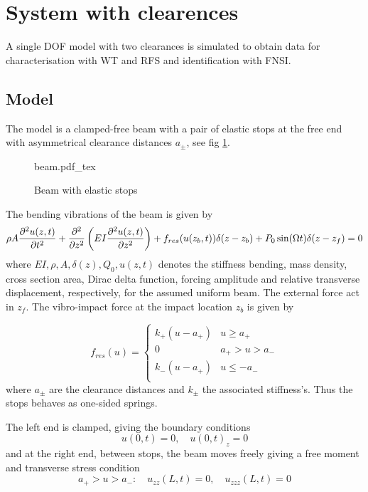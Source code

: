 \FloatBarrier
\section{System with clearences}
\label{sec:syst-with-clear}

A single DOF model with two clearances is simulated to obtain data for
characterisation with WT and RFS and identification with FNSI.

\subsection{Model}

The model is a clamped-free beam with a pair of elastic stops at the free end
with asymmetrical clearance distances $a_\pm$, see fig
\ref{fig:clear_schematic}.


\begin{figure}[!ht]
  \centering
  \centering
  \def\svgwidth{10cm}
  {beam.pdf_tex}
  \caption{Beam with elastic stops}
  \label{fig:clear_schematic}
\end{figure}


The bending vibrations of the beam is given by
\begin{equation}
  \label{eq:clear_EOM}
  \rho A \frac{\partial^2 u(z,t)}{\partial t^2} + \frac{\partial^2}{\partial z^2}
  \left( EI \frac{\partial^2 u(z,t)}{\partial z^2}  \right) +
  f_{res}(u(z_b,t)) \delta (z-z_b) +
  P_0 \sin(\Omega t) \delta(z-z_f)= 0
\end{equation}
where $EI, \rho, A, \delta(z), Q_0, u(z,t)$ denotes the stiffness bending, mass
density, cross section area, Dirac delta function, forcing amplitude and
relative transverse displacement, respectively, for the assumed uniform beam.
The external force act in $z_f$. The vibro-impact force at the impact location
$z_b$ is given by

\begin{equation}
  \label{eq:clear_vibro_force}
  f_{res}(u) =
  \begin{cases}
    k_+(u - a_+) & u \geq a_+ \\
    0 &  a_+ > u > a_- \\
    k_-(u - a_+) & u \leq - a_- \\
  \end{cases}
\end{equation}
where $a_\pm$ are the clearance distances and $k_\pm$ the associated
stiffness's. Thus the stops behaves as one-sided springs.

The left end is clamped, giving the boundary conditions
\begin{equation}
  u(0,t) = 0, \quad u(0,t)_z = 0
\end{equation}
and at the right end, between stops, the beam moves freely giving a free moment
and transverse stress condition
\begin{equation}
 a_+ > u > a_-: \quad u_{zz}(L,t) = 0, \quad u_{zzz}(L,t) = 0
\end{equation}

